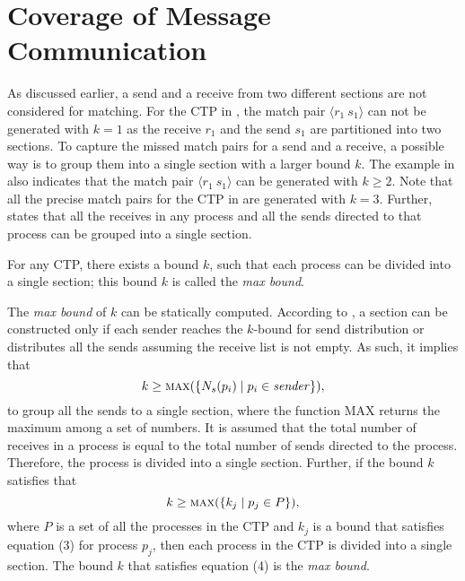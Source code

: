 \section{Coverage of Message Communication}

As discussed earlier, a send and a receive from two different sections are not considered for matching. For the CTP in , the match pair $\langle r_1\ s_1\rangle$ can not be generated with $k=1$ as the receive $r_1$ and the send $s_1$ are partitioned into two sections. 
To capture the missed match pairs for a send and a receive, a possible way is to group them into a single section with a larger bound $k$. The example in  also indicates that the match pair $\langle r_1\ s_1\rangle$ can be generated with $k\geq2$.  
Note that all the precise match pairs for the CTP in  are generated with $k=3$.
Further,  states that all the receives in any process and all the sends directed to that process can be grouped into a single section.
 
\begin{definition}
\label{def:maxbound}
For any CTP, there exists a bound $k$, such that each process can be divided into a single section; this bound $k$ is called the \textit{max bound}. 
\end{definition} 

The \textit{max bound} of $k$ can be statically computed. 
According to , a section can be constructed only if each sender reaches the $k$-bound for send distribution or distributes all the sends assuming the receive list is not empty. As such, it implies that 
\begin{equation}
k\ge \Call{max}{\{N_s(p_i)\mid p_i \in \mathit{sender}\}},
\end{equation}
to group all the sends to a single section, where the function $\mathrm{MAX}$ returns the maximum among a set of numbers. It is assumed that the total number of receives in a process is equal to the total number of sends directed to the process. Therefore, the process is divided into a single section. Further, if the bound $k$ satisfies that  
\begin{equation}
k\ge \Call{max}{\{k_j \mid p_j\in P\}},
\end{equation} 
where $P$ is a set of all the processes in the CTP and $k_j$ is a bound that satisfies equation (3) for process $p_j$, then each process in the CTP is divided into a single section. The bound $k$ that satisfies equation (4) is the \textit{max bound}. 

